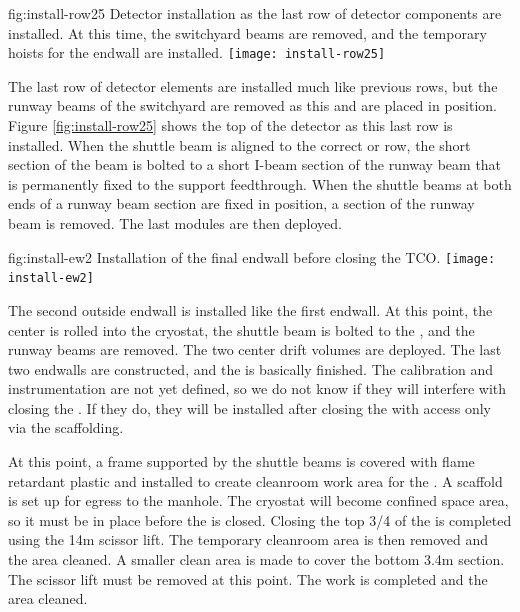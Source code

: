 \begin{dunefigure}{fig:install-row25}
  {Detector installation as the last row of detector components are installed. At this time, the switchyard beams are removed, and the temporary hoists for the endwall are installed.}
\texttt{[image: install-row25]}
\end{dunefigure}


The last row of detector elements are installed much like previous rows, but the runway beams of the  switchyard are removed as this  and  are placed in position. Figure \ref{fig:install-row25} shows the top of the detector as this last row is installed. When the shuttle beam is aligned to the correct  or  row, the short section of the beam is bolted to a short I-beam section of the runway beam that is permanently fixed to the  support feedthrough. When the shuttle beams at both ends of a runway beam section are fixed in position, a section of the runway beam is removed. The last  modules are then deployed. 


\begin{dunefigure}{fig:install-ew2}
  {Installation of the final endwall before closing the TCO.}
\texttt{[image: install-ew2]}
\end{dunefigure}

The second outside endwall is installed like the first endwall. At this point, the center  is rolled into the cryostat, the shuttle beam is bolted to the , and the runway beams are removed. The two center drift volumes  are deployed. The last two endwalls are constructed, and the  is basically finished. The calibration and instrumentation are not yet defined, so we do not know if they will interfere with closing the . If they do, they will be installed after closing the  with access only via the scaffolding. 

At this point, a frame supported by the shuttle beams is covered with flame retardant plastic and installed to create cleanroom work area for the .  A scaffold is set up for egress to the manhole. The cryostat will become confined space area, so it must be in place before the  is closed.  Closing the top 3/4 of the  is completed using the 14m scissor lift. The temporary cleanroom area is then removed and the area cleaned. A smaller clean area is made to cover the bottom 3.4m  section.  The scissor lift must be removed at this point. The  work is completed and the area cleaned.

